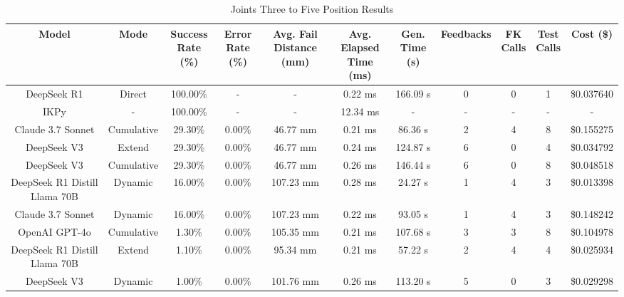 \begin{landscape}
\begin{table}[H]
\tiny
\renewcommand{\arraystretch}{1.2}
\caption{Joints Three to Five Position Results}
\begin{center}
\begin{tabular}{|c|c|c|c|c|c|c|c|c|c|c|}
    \hline
    \textbf{Model} & 
    \textbf{Mode} & 
    \makecell{\textbf{Success}\\\textbf{Rate (\%)}} &
    \makecell{\textbf{Error}\\\textbf{Rate (\%)}} &
    \makecell{\textbf{Avg. Fail}\\\textbf{Distance (mm)}} &
    \makecell{\textbf{Avg. Elapsed}\\\textbf{Time (ms)}} &
    \makecell{\textbf{Gen.}\\\textbf{Time (s)}} &
    \textbf{Feedbacks} &
    \makecell{\textbf{FK}\\\textbf{Calls}} &
    \makecell{\textbf{Test}\\\textbf{Calls}} &
    \textbf{Cost (\$)} \\
    \hline
    DeepSeek R1 & Direct & 100.00\% & - & - & 0.22 ms & 166.09 s & 0 & 0 & 1 & \$0.037640 \\
    \hline
    IKPy & - & 100.00\% & - & - & 12.34 ms & - & - & - & - & - \\
    \hline
    Claude 3.7 Sonnet & Cumulative & 29.30\% & 0.00\% & 46.77 mm & 0.21 ms & 86.36 s & 2 & 4 & 8 & \$0.155275 \\
    \hline
    DeepSeek V3 & Extend & 29.30\% & 0.00\% & 46.77 mm & 0.24 ms & 124.87 s & 6 & 0 & 4 & \$0.034792 \\
    \hline
    DeepSeek V3 & Cumulative & 29.30\% & 0.00\% & 46.77 mm & 0.26 ms & 146.44 s & 6 & 0 & 8 & \$0.048518 \\
    \hline
    DeepSeek R1 Distill Llama 70B & Dynamic & 16.00\% & 0.00\% & 107.23 mm & 0.28 ms & 24.27 s & 1 & 4 & 3 & \$0.013398 \\
    \hline
    Claude 3.7 Sonnet & Dynamic & 16.00\% & 0.00\% & 107.23 mm & 0.22 ms & 93.05 s & 1 & 4 & 3 & \$0.148242 \\
    \hline
    OpenAI GPT-4o & Cumulative & 1.30\% & 0.00\% & 105.35 mm & 0.21 ms & 107.68 s & 3 & 3 & 8 & \$0.104978 \\
    \hline
    DeepSeek R1 Distill Llama 70B & Extend & 1.10\% & 0.00\% & 95.34 mm & 0.21 ms & 57.22 s & 2 & 4 & 4 & \$0.025934 \\
    \hline
    DeepSeek V3 & Dynamic & 1.00\% & 0.00\% & 101.76 mm & 0.26 ms & 113.20 s & 5 & 0 & 3 & \$0.029298 \\

\end{tabular}
\end{center}
\end{table}
\end{landscape}
